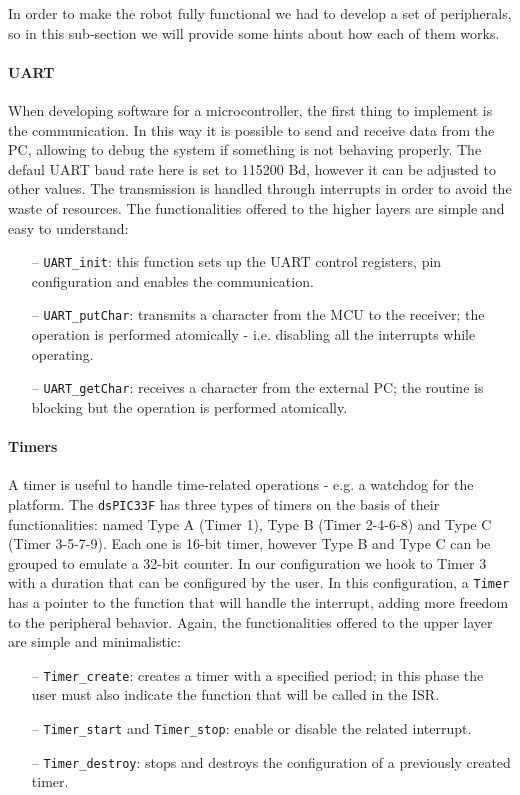 \documentclass[10pt,a4paper, notitlepage]{report}
\begin{document}
In order to make the robot fully functional we had to develop a set of peripherals, so in this sub-section we will provide some hints about how each of them works.
\paragraph*{UART}
When developing software for a microcontroller, the first thing to implement is the communication. In this way it is possible to send and receive data from the PC, allowing to debug the system if something is not behaving properly. 
The defaul UART baud rate here is set to 115200 Bd, however it can be adjusted to other values. The transmission is handled through interrupts in order to avoid the waste of resources. The functionalities offered to the higher layers are simple and easy to understand:
\begin{itemize}
  \item[--] \texttt{UART\_init}: this function sets up the UART control registers, pin configuration and enables the communication.
  \item[--] \texttt{UART\_putChar}: transmits a character from the MCU to the receiver; the operation is performed atomically - i.e. disabling all the interrupts while operating.
  \item[--] \texttt{UART\_getChar}: receives a character from the external PC; the routine is blocking but the operation is performed atomically.
\end{itemize}
\paragraph*{Timers}
A timer is useful to handle time-related operations - e.g. a watchdog for the platform. The \texttt{dsPIC33F} has three types of timers on the basis of their functionalities: named Type A (Timer 1), Type B (Timer 2-4-6-8) and Type C (Timer 3-5-7-9). Each one is 16-bit timer, however Type B and Type C can be grouped to emulate a 32-bit counter. In our configuration we hook to Timer 3 with a duration that can be configured by the user. In this configuration, a \texttt{Timer} has a pointer to the function that will handle the interrupt, adding more freedom to the peripheral behavior. Again, the functionalities offered to the upper layer are simple and minimalistic:
\begin{itemize}
  \item[--] \texttt{Timer\_create}: creates a timer with a specified period; in this phase the user must also indicate the function that will be called in the ISR.
  \item[--] \texttt{Timer\_start} and \texttt{Timer\_stop}: enable or disable the related interrupt.
  \item[--] \texttt{Timer\_destroy}: stops and destroys the configuration of a previously created timer.
\end{itemize}
\end{document}

